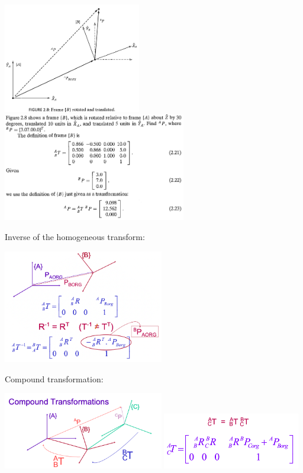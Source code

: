 \begin{center}
	\includegraphics[width=6cm]{sections/imgs/7.png}
	\includegraphics[width=8cm]{sections/imgs/8.png}
\end{center}
 
Inverse of the homogeneous transform:

\begin{center}
	\includegraphics[width=7cm]{sections/imgs/2_inverse_transform.png}
\end{center}

Compound transformation:

\begin{center}
	\includegraphics[width=7cm]{sections/imgs/2_compound_transformation_1.png}
	\includegraphics[width=6cm]{sections/imgs/2_compound_transformation_2.png}
\end{center}

